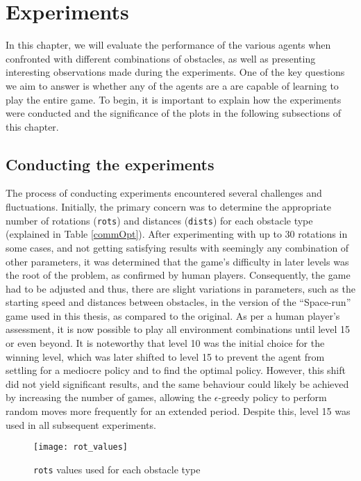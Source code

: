 \chapter{Experiments}
\label{experiments_chapter}
In this chapter, we will evaluate the performance of the various agents when
confronted with different combinations of obstacles, as well as presenting interesting observations made during the experiments. One of the key questions we aim to answer is whether any of the agents are a are capable of learning to play the entire game. To begin, it is important to explain how the experiments were conducted and the significance of the plots in the following subsections of this chapter.

\section{Conducting the experiments}
The process of conducting experiments encountered several challenges and fluctuations. Initially, the primary concern was to determine the appropriate number of rotations (\texttt{rots}) and distances (\texttt{dists}) for each obstacle type (explained in Table \ref{commOpt}). After experimenting with up to 30 rotations in some cases, and not getting satisfying results with seemingly any combination of other parameters, it was determined that the game's difficulty in later levels was the root of the problem, as confirmed by human players. Consequently, the game had to be adjusted and thus, there are slight variations in parameters, such as the starting speed and distances between obstacles, in the version of the ``Space-run'' game used in this thesis, as compared to the original. As per a human player's assessment, it is now possible to play all environment combinations until level 15 or even beyond. It is noteworthy that level 10 was the initial choice for the winning level, which was later shifted to level 15 to prevent the agent from settling for a mediocre policy and to find the optimal policy. However, this shift did not yield significant results, and the same behaviour could likely be achieved by increasing the number of games, allowing the $\epsilon$-greedy policy to perform random moves more frequently for an extended period. Despite this, level 15 was used in all subsequent experiments.

\begin{figure}[h]
    \centering
    \texttt{[image: rot\_values]}
    \caption{\texttt{rots} values used for each obstacle type}
    \label{fig:rot_values}
\end{figure}


